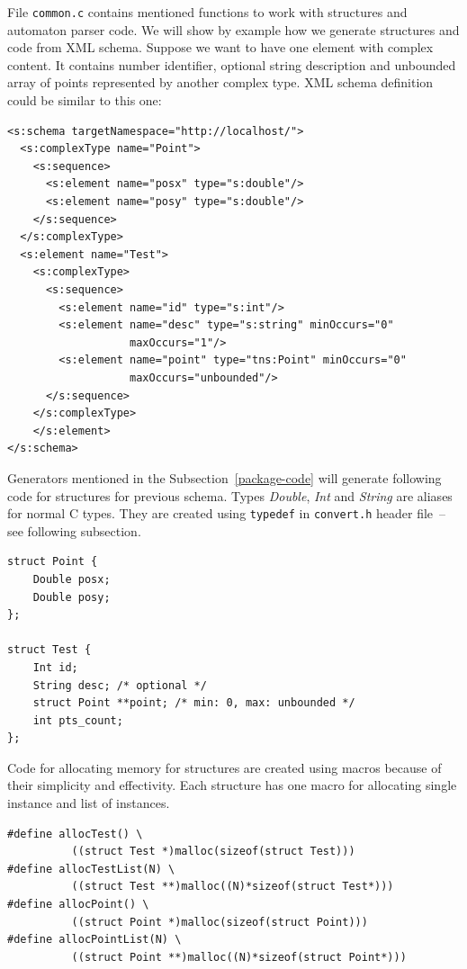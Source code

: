 \documentclass[12pt,notitlepage]{report}
\begin{document}
File \texttt{common.c} contains mentioned functions to work with structures and automaton parser code. We will show by example how we generate structures and code from XML schema. Suppose we want to have one element with complex content. It contains number identifier, optional string description and unbounded array of points represented by another complex type.  XML schema definition could be similar to this one:

\begin{small}
\begin{verbatim}
<s:schema targetNamespace="http://localhost/">
  <s:complexType name="Point">
    <s:sequence>
      <s:element name="posx" type="s:double"/>
      <s:element name="posy" type="s:double"/>
    </s:sequence>
  </s:complexType>
  <s:element name="Test">
    <s:complexType>
      <s:sequence>
        <s:element name="id" type="s:int"/>
        <s:element name="desc" type="s:string" minOccurs="0"
                   maxOccurs="1"/>
        <s:element name="point" type="tns:Point" minOccurs="0"
                   maxOccurs="unbounded"/>
      </s:sequence>
    </s:complexType>
    </s:element>
</s:schema>
\end{verbatim}
\end{small}

Generators mentioned in the Subsection~\ref{package-code} will generate following code for structures for previous schema. Types \textit{Double}, \textit{Int} and \textit{String} are aliases for normal C types. They are created using \texttt{typedef} in \texttt{convert.h} header file~-- see following subsection.

\begin{small}
\begin{lstlisting}
struct Point {
    Double posx;
    Double posy;
};

struct Test {
    Int id;
    String desc; /* optional */
    struct Point **point; /* min: 0, max: unbounded */
    int pts_count;
};
\end{lstlisting}
\end{small}

Code for allocating memory for structures are created using macros because of their simplicity and effectivity. Each structure has one macro for allocating single instance and list of instances.
\begin{small}
\begin{lstlisting}
#define allocTest() \
          ((struct Test *)malloc(sizeof(struct Test)))
#define allocTestList(N) \
          ((struct Test **)malloc((N)*sizeof(struct Test*)))
#define allocPoint() \
          ((struct Point *)malloc(sizeof(struct Point)))
#define allocPointList(N) \
          ((struct Point **)malloc((N)*sizeof(struct Point*)))
\end{lstlisting}
\end{small}
\end{document}
